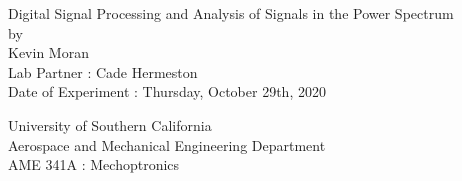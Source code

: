 \documentclass[letterpaper,12pt]{article}
\begin{document}
\begin{titlepage}
 \begin{center}
 \vspace*{1in}
{\Huge Digital Signal Processing and Analysis of Signals in the Power Spectrum}\\
    \bigskip
    by\\
    \bigskip
    {\Large Kevin Moran} \\
    \bigskip
    Lab Partner : Cade Hermeston\\
    Date of Experiment : Thursday, October 29th, 2020

    \bigskip\bigskip\bigskip
    University of Southern California\\
    Aerospace and Mechanical Engineering Department\\
    AME 341A : Mechoptronics
 \end{center}
\end{titlepage}

\begin{abstract}
    Utilizing the power spectra for digital signal processing provides a efficient method for managing, interpreting, and transmitting data. By using a function generator to control various types of signals and a National Instruments data acquisition system with a custom virtual interface to collect data, signals were successfully measured and represented in the frequency domain. Using a sampling rate of 2500 Hz, a sine wave with frequency of 1500 Hz was purposely aliased and represented in the power spectrum with an observable frequency of 1001 Hz. Additionally, an unknown signal was replicated by analyzing fundamental frequencies and harmonics in the power spectrum. This unknown signal was determined to be comprised of a 777 Hz sine wave embedded in a 33 Hz triangle wave with 50\% symmetry.   
\end{abstract}

\end{document}
